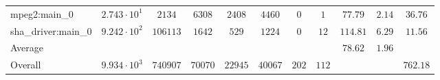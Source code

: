 \begin{tabular}{|l|c|c|c|c|c|c|c|c|c|c|}
mpeg2:main\_0       & $ 2.743 \cdot 10^{1} $ & $ 2134   $ & $ 6308  $ & $ 2408  $ & $ 4460  $ & $ 0   $ & $ 1   $ & $ 77.79       $ & $ 2.14    $ & $ 36.76   $ \\
sha\_driver:main\_0 & $ 9.242 \cdot 10^{2} $ & $ 106113 $ & $ 1642  $ & $ 529   $ & $ 1224  $ & $ 0   $ & $ 12  $ & $ 114.81      $ & $ 6.29    $ & $ 11.56   $ \\
\hline
Average             & $                    $ & $        $ & $       $ & $       $ & $       $ & $     $ & $     $ & $ 78.62       $ & $ 1.96    $ & $         $ \\
\hline
Overall             & $ 9.934 \cdot 10^{3} $ & $ 740907 $ & $ 70070 $ & $ 22945 $ & $ 40067 $ & $ 202 $ & $ 112 $ & $             $ & $         $ & $ 762.18  $ \\
\hline
\end{tabular}
